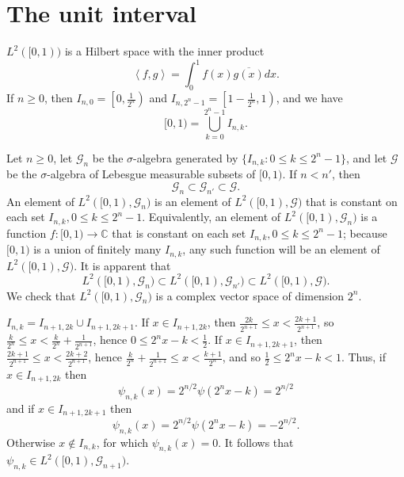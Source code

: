 \documentclass{article}
\newcommand{\inner}[2]{\left\langle #1, #2 \right\rangle}
\theoremstyle{definition}
\theoremstyle{definition}
\begin{document}
\section{The unit interval}
$L^2([0,1))$ is a Hilbert space with the inner product
\[
\inner{f}{g} = \int_0^1 f(x) \overline{g(x)} dx.
\]
If $n \geq 0$, then $I_{n,0}=\left[0,\frac{1}{2^n}\right)$ and $I_{n,2^n-1}=\left[1-\frac{1}{2^n},1\right)$, and we have
\[
[0,1)=\bigcup_{k=0}^{2^n-1} I_{n,k}.
\]


Let $n \geq 0$,
let $\mathscr{G}_n$ be the $\sigma$-algebra generated by $\{I_{n,k}: 0 \leq k \leq 2^n-1\}$, and let
$\mathscr{G}$ be the $\sigma$-algebra of Lebesgue measurable subsets of $[0,1)$. If $n<n'$, then
\[
\mathscr{G}_n \subset \mathscr{G}_{n'} \subset \mathscr{G}.
\]
An element of $L^2([0,1),\mathscr{G}_n)$ is an element of $L^2([0,1),\mathscr{G})$ that is constant on each
set $I_{n,k}, 0 \leq k \leq 2^n-1$. Equivalently, an element of $L^2([0,1),\mathscr{G}_n)$ is a function
$f:[0,1) \to \mathbb{C}$ that is constant on each set $I_{n,k}, 0 \leq k \leq 2^n-1$; because $[0,1)$ is a union
of finitely many $I_{n,k}$, any such function will be an element of $L^2([0,1),\mathscr{G})$.
It is apparent that
\[
L^2([0,1),\mathscr{G}_n) \subset L^2([0,1),\mathscr{G}_{n'}) \subset L^2([0,1),\mathscr{G}).
\]
We check that
$L^2([0,1),\mathscr{G}_n)$ is a complex vector space of dimension $2^n$.

$I_{n,k}=I_{n+1,2k} \cup I_{n+1,2k+1}$. If $x \in I_{n+1,2k}$, then $\frac{2k}{2^{n+1}} \leq x < \frac{2k+1}{2^{n+1}}$, so
$\frac{k}{2^n} \leq x< \frac{k}{2^n}+\frac{1}{2^{n+1}}$, hence
$0 \leq 2^nx-k< \frac{1}{2}$. If $x \in I_{n+1,2k+1}$, then $\frac{2k+1}{2^{n+1}} \leq x < \frac{2k+2}{2^{n+1}}$, hence
$\frac{k}{2^n}+\frac{1}{2^{n+1}} \leq x < \frac{k+1}{2^n}$, and so $\frac{1}{2} \leq 2^nx-k < 1$.
Thus, if $x \in I_{n+1,2k}$ then
\[
\psi_{n,k}(x)=2^{n/2}\psi(2^nx-k) = 2^{n/2}
\]
and  if $x \in I_{n+1,2k+1}$ then
\[
\psi_{n,k}(x)=2^{n/2}\psi(2^nx-k)=-2^{n/2}.
\]
Otherwise $x \not \in I_{n,k}$, for which $\psi_{n,k}(x)=0$.
It follows that $\psi_{n,k} \in L^2([0,1),\mathscr{G}_{n+1})$.
\end{document}
